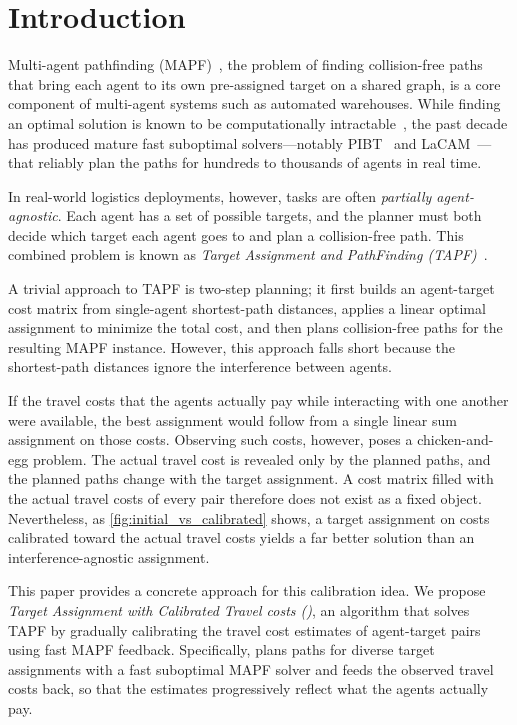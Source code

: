 \section{Introduction}
Multi-agent pathfinding (MAPF)~\cite{stern2019def}, the problem of finding
collision-free paths that bring each agent to its own pre-assigned target on a shared graph, is a core component of multi-agent systems such as automated warehouses.
While finding an optimal solution is known to be computationally intractable~\cite{yu2013structure}, the past decade has produced mature fast suboptimal solvers---notably PIBT~\cite{okumura2022priority} and LaCAM~\cite{okumura2023lacam}---that reliably plan the paths for hundreds to thousands of agents in real time.

In real-world logistics deployments, however, tasks are often \emph{partially agent-agnostic}.
Each agent has a set of possible targets, and the planner must both decide which target each agent goes to and plan a collision-free path.
This combined problem is known as \emph{Target Assignment and PathFinding (TAPF)}~\cite{ma2016tapf}.

A trivial approach to TAPF is two-step planning;
it first builds an agent-target cost matrix from single-agent shortest-path distances, applies a linear optimal assignment to minimize the total cost, and then plans collision-free paths for the resulting MAPF instance.
However, this approach falls short because the shortest-path distances ignore the interference between agents.

If the travel costs that the agents actually pay while interacting with one another were available, the best assignment would follow from a single linear sum assignment on those costs.
Observing such costs, however, poses a chicken-and-egg problem.
The actual travel cost is revealed only by the planned paths, and the planned paths change with the target assignment.
A cost matrix filled with the actual travel costs of every pair therefore does not exist as a fixed object.
Nevertheless, as \cref{fig:initial_vs_calibrated} shows, a target assignment on costs calibrated toward the actual travel costs yields a far better solution than an interference-agnostic assignment.

This paper provides a concrete approach for this calibration idea.
We propose \emph{Target Assignment with Calibrated Travel costs (\planner)}, an algorithm that solves TAPF by gradually calibrating the travel cost estimates of agent-target pairs using fast MAPF feedback.
Specifically, \planner plans paths for diverse target assignments with a fast suboptimal MAPF solver and feeds the observed travel costs back, so that the estimates progressively reflect what the agents actually pay. 

